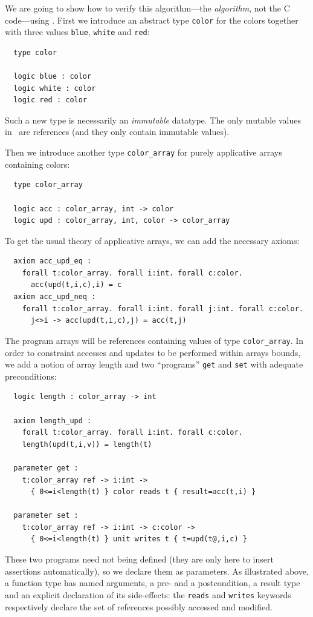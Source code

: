 \documentclass[a4paper,12pt]{report}
\makeatletter
\newcommand{\indextt}[1]{\index{#1@\texttt{#1}}}
\makeatother
\begin{document}
\indextt{type}\indextt{logic}\indextt{axiom}

We are going to show how to verify this algorithm---the
\emph{algorithm}, not the C code---using \why. 
First we introduce an abstract type \texttt{color} for the colors
together with three values \texttt{blue}, \texttt{white} and \texttt{red}:
\begin{verbatim}
  type color

  logic blue : color
  logic white : color
  logic red : color
\end{verbatim}
Such a new type is necessarily an \emph{immutable} datatype. The only
mutable values in \why\ are references (and they only contain
immutable values).

Then we introduce another type \texttt{color\_array} for
purely applicative arrays containing colors: 
\begin{verbatim}
  type color_array

  logic acc : color_array, int -> color
  logic upd : color_array, int, color -> color_array
\end{verbatim}
To get the usual theory of applicative arrays, we can add the
necessary axioms: 
\begin{verbatim}
  axiom acc_upd_eq : 
    forall t:color_array. forall i:int. forall c:color.
      acc(upd(t,i,c),i) = c
  axiom acc_upd_neq : 
    forall t:color_array. forall i:int. forall j:int. forall c:color.
      j<>i -> acc(upd(t,i,c),j) = acc(t,j)
\end{verbatim}

The program arrays will be references containing values of type
\texttt{color\_array}. In order to constraint accesses and updates to
be performed within arrays bounds, we add a notion of array length and
two ``programs'' \texttt{get} and \texttt{set} with adequate preconditions:
\begin{verbatim}
  logic length : color_array -> int

  axiom length_upd : 
    forall t:color_array. forall i:int. forall c:color.  
    length(upd(t,i,v)) = length(t)

  parameter get : 
    t:color_array ref -> i:int -> 
      { 0<=i<length(t) } color reads t { result=acc(t,i) }

  parameter set : 
    t:color_array ref -> i:int -> c:color -> 
      { 0<=i<length(t) } unit writes t { t=upd(t@,i,c) }
\end{verbatim}
These two programs need not being defined (they are only here to
insert assertions automatically), so we declare them as
parameters. 
As illustrated above, a function type has named arguments, a pre- and
a postcondition, a result type and an explicit declaration of its
side-effects: the \texttt{reads} and \texttt{writes} keywords
respectively declare the set of references possibly
accessed and modified.
\end{document}

